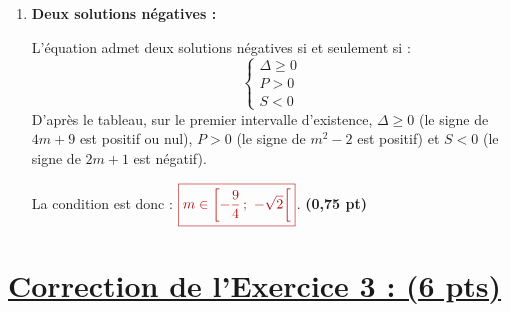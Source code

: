 \documentclass[12pt,a4paper]{article}
\newcommand{\redtitle}[1]{\textcolor{myred}{\textbf{#1}}}
\newcommand{\redbox}[1]{\color{myred}\boxed{#1}\color{black}}
\begin{document}
\begin{enumerate}
\begin{enumerate}
        La condition est donc : $\redbox{m \in ]\sqrt{2} \,;~ +\infty[}$. \hfill \textbf{(0,75 pt)}
        
        \item \redtitle{Deux solutions négatives :}
        
        L'équation admet deux solutions négatives si et seulement si :
        \[ \begin{cases} \Delta \geq 0 \\ P > 0 \\ S < 0 \end{cases} \]
        D'après le tableau, sur le premier intervalle d'existence, $\Delta \geq 0$ (le signe de $4m+9$ est positif ou nul), $P > 0$ (le signe de $m^2-2$ est positif) et $S < 0$ (le signe de $2m+1$ est négatif).
        
        La condition est donc : $\redbox{m \in \left[ -\dfrac{9}{4} \,;~ -\sqrt{2} \right[}$. \hfill \textbf{(0,75 pt)}
    \end{enumerate}
\end{enumerate}


\section*{\underline{\redtitle{Correction de l'Exercice 3 : (6 pts)}}}
\end{document}
